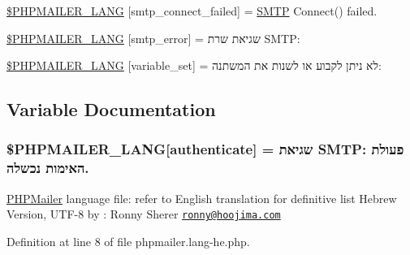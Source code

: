 \begin{DoxyCompactItemize}
\item 
\hyperlink{phpmailer_8lang-he_8php_a7b321d4ca1e9df702403ed4c61aa0980}{\$\+P\+H\+P\+M\+A\+I\+L\+E\+R\+\_\+\+L\+A\+NG} \mbox{[}\textquotesingle{}smtp\+\_\+connect\+\_\+failed\textquotesingle{}\mbox{]} = \textquotesingle{}\hyperlink{class_s_m_t_p}{S\+M\+TP} Connect() failed.\textquotesingle{}
\item 
\hyperlink{phpmailer_8lang-he_8php_a7d9cffba1e669c845f8a4c891ee50064}{\$\+P\+H\+P\+M\+A\+I\+L\+E\+R\+\_\+\+L\+A\+NG} \mbox{[}\textquotesingle{}smtp\+\_\+error\textquotesingle{}\mbox{]} = \textquotesingle{}שגיאת שרת S\+M\+T\+P\+: \textquotesingle{}
\item 
\hyperlink{phpmailer_8lang-he_8php_af795debc7a739d038742691c358d9032}{\$\+P\+H\+P\+M\+A\+I\+L\+E\+R\+\_\+\+L\+A\+NG} \mbox{[}\textquotesingle{}variable\+\_\+set\textquotesingle{}\mbox{]} = \textquotesingle{}לא ניתן לקבוע או לשנות את המשתנה\+: \textquotesingle{}
\end{DoxyCompactItemize}


\subsection{Variable Documentation}
\subsubsection[{\texorpdfstring{\$\+P\+H\+P\+M\+A\+I\+L\+E\+R\+\_\+\+L\+A\+NG}{$PHPMAILER_LANG}}]{\setlength{\rightskip}{0pt plus 5cm}\$P\+H\+P\+M\+A\+I\+L\+E\+R\+\_\+\+L\+A\+NG\mbox{[}\textquotesingle{}authenticate\textquotesingle{}\mbox{]} = \textquotesingle{}שגיאת S\+M\+T\+P\+: פעולת האימות נכשלה.\textquotesingle{}}\hypertarget{phpmailer_8lang-he_8php_a2cb33073c989b85580748e331ed8b4aa}{}\label{phpmailer_8lang-he_8php_a2cb33073c989b85580748e331ed8b4aa}
\hyperlink{class_p_h_p_mailer}{P\+H\+P\+Mailer} language file\+: refer to English translation for definitive list Hebrew Version, U\+T\+F-\/8 by \+: Ronny Sherer \href{mailto:ronny@hoojima.com}{\tt ronny@hoojima.\+com} 

Definition at line 8 of file phpmailer.\+lang-\/he.\+php.

